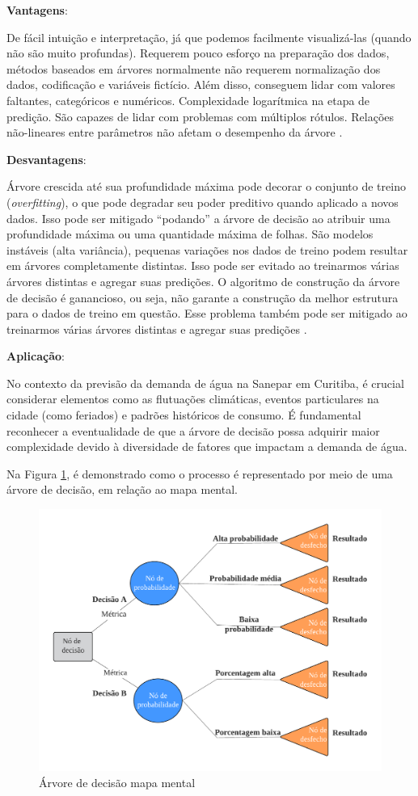 \noindent\textbf{Vantagens}:


De fácil intuição e interpretação, já que podemos facilmente visualizá-las (quando não são muito profundas).
Requerem pouco esforço na preparação dos dados, métodos baseados em árvores normalmente não requerem normalização dos dados, codificação e variáveis fictício. Além disso, conseguem lidar com valores faltantes, categóricos e numéricos.
Complexidade logarítmica na etapa de predição.
São capazes de lidar com problemas com múltiplos rótulos.
Relações não-lineares entre parâmetros não afetam o desempenho da árvore \cite{remigio2023arvores}.


\noindent\textbf{Desvantagens}:

Árvore crescida até sua profundidade máxima pode decorar o conjunto de treino (\textit{overfitting}), o que pode degradar seu poder preditivo quando aplicado a novos dados. Isso pode ser mitigado “podando” a árvore de decisão ao atribuir uma profundidade máxima ou uma quantidade máxima de folhas.
São modelos instáveis (alta variância), pequenas variações nos dados de treino podem resultar em árvores completamente distintas. Isso pode ser evitado ao treinarmos várias árvores distintas e agregar suas predições.
O algoritmo de construção da árvore de decisão é ganancioso, ou seja, não garante a construção da melhor estrutura para o dados de treino em questão. Esse problema também pode ser mitigado ao treinarmos várias árvores distintas e agregar suas predições \cite{remigio2023arvores}.


\textbf{Aplicação}:

No contexto da previsão da demanda de água na Sanepar em Curitiba, é crucial considerar elementos como as flutuações climáticas, eventos particulares na cidade (como feriados) e padrões históricos de consumo. É fundamental reconhecer a eventualidade de que a árvore de decisão possa adquirir maior complexidade devido à diversidade de fatores que impactam a demanda de água.

Na Figura \ref{fig:arvore-de-decisao}, é demonstrado como o processo é representado por meio de uma árvore de decisão, em relação ao mapa mental.

\begin{figure}[H]
	\centering
	\caption{Árvore de decisão mapa mental}
	\label{fig:arvore-de-decisao}
	\includegraphics[width=0.7\linewidth]{"Apendices/Figuras/modelagem-24h/Árvore de decisão"}
	
\end{figure}



